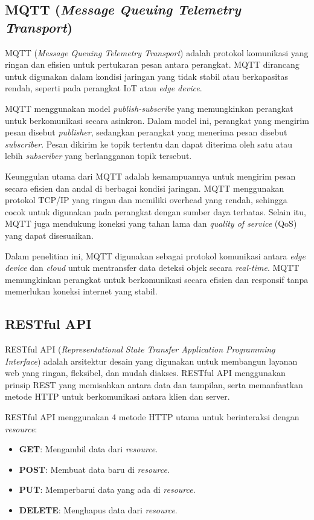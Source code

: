 \subsection{MQTT (\emph{Message Queuing Telemetry Transport})}

MQTT (\emph{Message Queuing Telemetry Transport}) adalah protokol komunikasi yang ringan dan efisien untuk pertukaran pesan antara perangkat. MQTT dirancang untuk digunakan dalam kondisi jaringan yang tidak stabil atau berkapasitas rendah, seperti pada perangkat IoT atau \emph{edge device}.

MQTT menggunakan model \emph{publish-subscribe} yang memungkinkan perangkat untuk berkomunikasi secara asinkron. Dalam model ini, perangkat yang mengirim pesan disebut \emph{publisher}, sedangkan perangkat yang menerima pesan disebut \emph{subscriber}. Pesan dikirim ke topik tertentu dan dapat diterima oleh satu atau lebih \emph{subscriber} yang berlangganan topik tersebut.

Keunggulan utama dari MQTT adalah kemampuannya untuk mengirim pesan secara efisien dan andal di berbagai kondisi jaringan. MQTT menggunakan protokol TCP/IP yang ringan dan memiliki overhead yang rendah, sehingga cocok untuk digunakan pada perangkat dengan sumber daya terbatas. Selain itu, MQTT juga mendukung koneksi yang tahan lama dan \emph{quality of service} (QoS) yang dapat disesuaikan.

Dalam penelitian ini, MQTT digunakan sebagai protokol komunikasi antara \emph{edge device} dan \emph{cloud} untuk mentransfer data deteksi objek secara \emph{real-time}. MQTT memungkinkan perangkat untuk berkomunikasi secara efisien dan responsif tanpa memerlukan koneksi internet yang stabil. \parencite*{mqtts2008}

\subsection{RESTful API}

RESTful API (\emph{Representational State Transfer Application Programming Interface}) adalah arsitektur desain yang digunakan untuk membangun layanan web yang ringan, fleksibel, dan mudah diakses. RESTful API menggunakan prinsip REST yang memisahkan antara data dan tampilan, serta memanfaatkan metode HTTP untuk berkomunikasi antara klien dan server.

RESTful API menggunakan 4 metode HTTP utama untuk berinteraksi dengan \emph{resource}:
\begin{itemize}
  \item \textbf{GET}: Mengambil data dari \emph{resource}.
  \item \textbf{POST}: Membuat data baru di \emph{resource}.
  \item \textbf{PUT}: Memperbarui data yang ada di \emph{resource}.
  \item \textbf{DELETE}: Menghapus data dari \emph{resource}.
\end{itemize}

